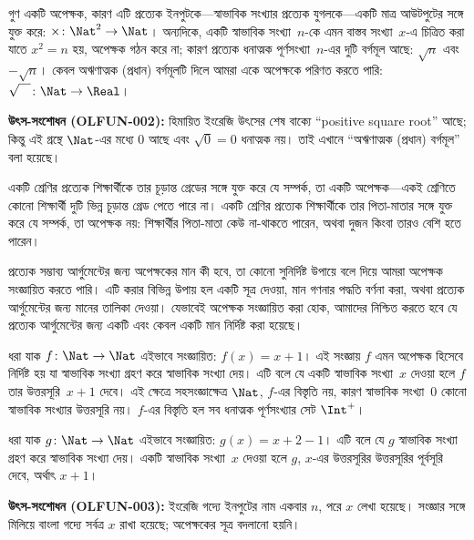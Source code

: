 \documentclass[../../../include/open-logic-section]{subfiles}
\begin{document}
\begin{ex}
গুণ একটি অপেক্ষক, কারণ এটি প্রত্যেক ইনপুটকে---স্বাভাবিক সংখ্যার প্রত্যেক যুগলকে---একটি মাত্র আউটপুটের সঙ্গে যুক্ত করে: $\times \colon \Nat^2 \to \Nat$। অন্যদিকে, একটি স্বাভাবিক সংখ্যা~$n$-কে এমন বাস্তব সংখ্যা~$x$-এ চিত্রিত করা যাতে $x^2 = n$ হয়, অপেক্ষক গঠন করে না; কারণ প্রত্যেক ধনাত্মক পূর্ণসংখ্যা~$n$-এর দুটি বর্গমূল আছে: $\sqrt{n}$ এবং~$-\sqrt{n}$। কেবল অঋণাত্মক (প্রধান) বর্গমূলটি দিলে আমরা একে অপেক্ষকে পরিণত করতে পারি: $\sqrt{\phantom{X}} \colon \Nat \to \Real$। %
\par\smallskip\noindent\textnormal{\small\textbf{উৎস-সংশোধন (OLFUN-002):} হিমায়িত ইংরেজি উৎসের শেষ বাক্যে ``positive square root'' আছে; কিন্তু এই গ্রন্থে $\Nat$-এর মধ্যে $0$ আছে এবং $\sqrt{0}=0$ ধনাত্মক নয়। তাই এখানে ``অঋণাত্মক (প্রধান) বর্গমূল'' বলা হয়েছে।} %
\end{ex}

\begin{ex}
একটি শ্রেণির প্রত্যেক শিক্ষার্থীকে তার চূড়ান্ত গ্রেডের সঙ্গে যুক্ত করে যে সম্পর্ক, তা একটি অপেক্ষক---একই শ্রেণিতে কোনো শিক্ষার্থী দুটি ভিন্ন চূড়ান্ত গ্রেড পেতে পারে না। একটি শ্রেণির প্রত্যেক শিক্ষার্থীকে তার পিতা-মাতার সঙ্গে যুক্ত করে যে সম্পর্ক, তা অপেক্ষক নয়: শিক্ষার্থীর পিতা-মাতা কেউ না-থাকতে পারেন, অথবা দুজন কিংবা তারও বেশি হতে পারেন।
\end{ex}

\begin{explain}
প্রত্যেক সম্ভাব্য আর্গুমেন্টের জন্য অপেক্ষকের মান কী হবে, তা কোনো সুনির্দিষ্ট উপায়ে বলে দিয়ে আমরা অপেক্ষক সংজ্ঞায়িত করতে পারি। এটি করার বিভিন্ন উপায় হল একটি সূত্র দেওয়া, মান গণনার পদ্ধতি বর্ণনা করা, অথবা প্রত্যেক আর্গুমেন্টের জন্য মানের তালিকা দেওয়া। যেভাবেই অপেক্ষক সংজ্ঞায়িত করা হোক, আমাদের নিশ্চিত করতে হবে যে প্রত্যেক আর্গুমেন্টের জন্য একটি এবং কেবল একটি মান নির্দিষ্ট করা হয়েছে।
\end{explain}

\begin{ex}
ধরা যাক $f \colon \Nat \to \Nat$ এইভাবে সংজ্ঞায়িত: $f(x) = x+1$। এই সংজ্ঞায় $f$ এমন অপেক্ষক হিসেবে নির্দিষ্ট হয় যা স্বাভাবিক সংখ্যা গ্রহণ করে স্বাভাবিক সংখ্যা দেয়। এটি বলে যে একটি স্বাভাবিক সংখ্যা~$x$ দেওয়া হলে $f$ তার উত্তরসূরি~$x+1$ দেবে। এই ক্ষেত্রে সহসংজ্ঞাক্ষেত্র $\Nat$, $f$-এর বিস্তৃতি নয়, কারণ স্বাভাবিক সংখ্যা~$0$ কোনো স্বাভাবিক সংখ্যার উত্তরসূরি নয়। $f$-এর বিস্তৃতি হল সব ধনাত্মক পূর্ণসংখ্যার সেট $\Int^{+}$।
\end{ex}

\begin{ex}
ধরা যাক $g \colon \Nat \to \Nat$ এইভাবে সংজ্ঞায়িত: $g(x) = x+2-1$। এটি বলে যে $g$ স্বাভাবিক সংখ্যা গ্রহণ করে স্বাভাবিক সংখ্যা দেয়। একটি স্বাভাবিক সংখ্যা~$x$ দেওয়া হলে $g$, $x$-এর উত্তরসূরির উত্তরসূরির পূর্বসূরি দেবে, অর্থাৎ $x+1$। %
\par\smallskip\noindent\textnormal{\small\textbf{উৎস-সংশোধন (OLFUN-003):} ইংরেজি গদ্যে ইনপুটের নাম একবার $n$, পরে $x$ লেখা হয়েছে। সংজ্ঞার সঙ্গে মিলিয়ে বাংলা গদ্যে সর্বত্র $x$ রাখা হয়েছে; অপেক্ষকের সূত্র বদলানো হয়নি।} %
\end{ex}
\end{document}

